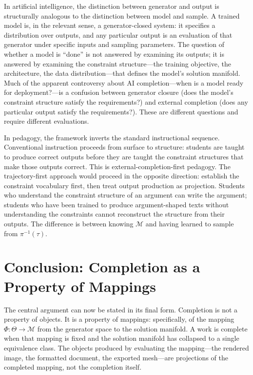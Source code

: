\documentclass[11pt, twoside]{article}
\theoremstyle{plain}
\theoremstyle{definition}
\theoremstyle{remark}
\begin{document}
In artificial intelligence, the distinction between generator and output is structurally analogous to the distinction between model and sample. A trained model is, in the relevant sense, a generator-closed system: it specifies a distribution over outputs, and any particular output is an evaluation of that generator under specific inputs and sampling parameters. The question of whether a model is ``done'' is not answered by examining its outputs; it is answered by examining the constraint structure---the training objective, the architecture, the data distribution---that defines the model's solution manifold. Much of the apparent controversy about AI completion---when is a model ready for deployment?---is a confusion between generator closure (does the model's constraint structure satisfy the requirements?) and external completion (does any particular output satisfy the requirements?). These are different questions and require different evaluations.

In pedagogy, the framework inverts the standard instructional sequence. Conventional instruction proceeds from surface to structure: students are taught to produce correct outputs before they are taught the constraint structures that make those outputs correct. This is external-completion-first pedagogy. The trajectory-first approach would proceed in the opposite direction: establish the constraint vocabulary first, then treat output production as projection. Students who understand the constraint structure of an argument can write the argument; students who have been trained to produce argument-shaped texts without understanding the constraints cannot reconstruct the structure from their outputs. The difference is between knowing $\mathcal{M}$ and having learned to sample from $\pi^{-1}(\tau)$.

\section{Conclusion: Completion as a Property of Mappings}
\label{sec:conclusion}

The central argument can now be stated in its final form. Completion is not a property of objects. It is a property of mappings: specifically, of the mapping $\Phi : \Theta \to \mathcal{M}$ from the generator space to the solution manifold. A work is complete when that mapping is fixed and the solution manifold has collapsed to a single equivalence class. The objects produced by evaluating the mapping---the rendered image, the formatted document, the exported mesh---are projections of the completed mapping, not the completion itself.
\end{document}
